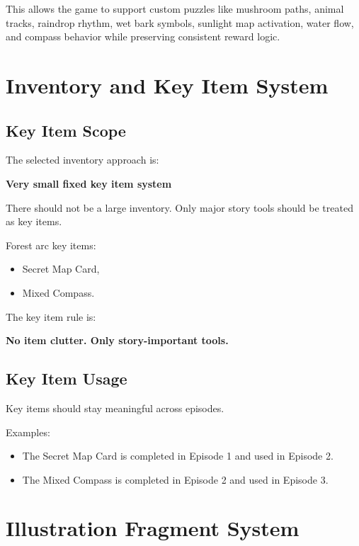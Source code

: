 \documentclass[12pt]{article}
\begin{document}
This allows the game to support custom puzzles like mushroom paths, animal tracks, raindrop rhythm, wet bark symbols, sunlight map activation, water flow, and compass behavior while preserving consistent reward logic.

\section{Inventory and Key Item System}

\subsection{Key Item Scope}

The selected inventory approach is:

\begin{center}
\textbf{Very small fixed key item system}
\end{center}

There should not be a large inventory. Only major story tools should be treated as key items.

Forest arc key items:

\begin{itemize}[leftmargin=*]
    \item Secret Map Card,
    \item Mixed Compass.
\end{itemize}

The key item rule is:

\begin{center}
\textbf{No item clutter. Only story-important tools.}
\end{center}

\subsection{Key Item Usage}

Key items should stay meaningful across episodes.

Examples:

\begin{itemize}[leftmargin=*]
    \item The Secret Map Card is completed in Episode 1 and used in Episode 2.
    \item The Mixed Compass is completed in Episode 2 and used in Episode 3.
\end{itemize}

\section{Illustration Fragment System}
\end{document}
